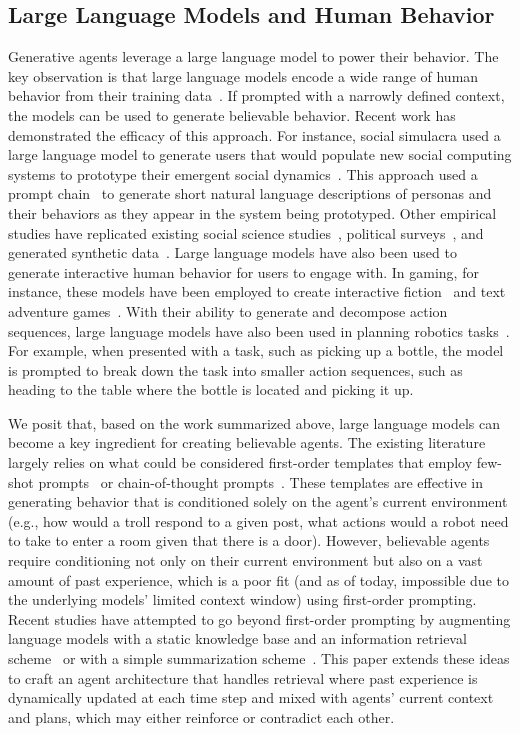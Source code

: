 \subsection{Large Language Models and Human Behavior}
Generative agents leverage a large language model to power their behavior. The key observation is that large language models encode a wide range of human behavior from their training data~\cite{59_brown2020language, 60_bommasani2022opportunities}. If prompted with a narrowly defined context, the models can be used to generate believable behavior. Recent work has demonstrated the efficacy of this approach. For instance, social simulacra used a large language model to generate users that would populate new social computing systems to prototype their emergent social dynamics~\cite{9_park2022socialsimulacra}. This approach used a prompt chain~\cite{61_Wu2022PromptChainer, 62_Wu2021AIChains} to generate short natural language descriptions of personas and their behaviors as they appear in the system being prototyped. Other empirical studies have replicated existing social science studies~\cite{63_horton2023large}, political surveys~\cite{64_Sorensen_2022}, and generated synthetic data~\cite{hamalainen2023evaluating}. Large language models have also been used to generate interactive human behavior for users to engage with. In gaming, for instance, these models have been employed to create interactive fiction~\cite{65_Freiknecht2020Procedural} and text adventure games~\cite{66_callison-burch-etal-2022-dungeons}. With their ability to generate and decompose action sequences, large language models have also been used in planning robotics tasks~\cite{67_huang2022inner}. For example, when presented with a task, such as picking up a bottle, the model is prompted to break down the task into smaller action sequences, such as heading to the table where the bottle is located and picking it up.

We posit that, based on the work summarized above, large language models can become a key ingredient for creating believable agents. The existing literature largely relies on what could be considered first-order templates that employ few-shot prompts~\cite{68_Gao2020Making, 69_Liu2021What} or chain-of-thought prompts~\cite{70_wei2023chainofthought}. These templates are effective in generating behavior that is conditioned solely on the agent's current environment (e.g., how would a troll respond to a given post, what actions would a robot need to take to enter a room given that there is a door). However, believable agents require conditioning not only on their current environment but also on a vast amount of past experience, which is a poor fit (and as of today, impossible due to the underlying models' limited context window) using first-order prompting. Recent studies have attempted to go beyond first-order prompting by augmenting language models with a static knowledge base and an information retrieval scheme~\cite{khattab2023demonstratesearchpredict} or with a simple summarization scheme~\cite{wu2021recursively}. This paper extends these ideas to craft an agent architecture that handles retrieval where past experience is dynamically updated at each time step and mixed with agents' current context and plans, which may either reinforce or contradict each other.